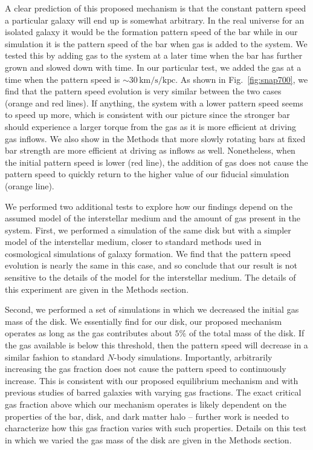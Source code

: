 \documentclass[twoside]{natureprintstyle}
\newcommand{\Nbody}{$N$-body}
\begin{document}
A clear prediction of this proposed mechanism is that the constant pattern
speed a particular galaxy will end up is somewhat arbitrary. In the real
universe for an isolated galaxy it would be the formation pattern speed of the
bar while in our simulation it is the pattern speed of the bar when gas is
added to the system. We tested this by adding gas to the system at a later
time when the bar has further grown and slowed down with time. In our
particular test, we added the gas at a time when the pattern speed is
$\sim30\,\textrm{km}/\textrm{s}/\textrm{kpc}$. As shown in
Fig.~\ref{fig:snap700}, we find that the pattern speed evolution is very
similar between the two cases (orange and red lines). If anything, the system
with a lower pattern speed seems to speed up more, which is consistent with
our picture since the stronger bar should experience a larger torque from the
gas as it is more efficient at driving gas inflows. We also show in the
Methods that more slowly rotating bars at fixed bar strength are more
efficient at driving as inflows as well. Nonetheless, when the initial pattern
speed is lower (red line), the addition of gas does not cause the pattern
speed to quickly return to the higher value of our fiducial simulation (orange
line).

We performed two additional tests to explore how our findings depend on the
assumed model of the interstellar medium and the amount of gas present in the
system. First, we performed a simulation of the same disk but with a simpler
model of the interstellar medium\cite{2003MNRAS.339..289S}, closer to standard
methods used in cosmological simulations of galaxy formation. We find that the
pattern speed evolution is nearly the same in this case, and so conclude that
our result is not sensitive to the details of the model for the interstellar
medium. The details of this experiment are given in the Methods section.

Second, we performed a set of simulations in which we decreased the initial
gas mass of the disk. We essentially find for our disk, our proposed mechanism
operates as long as the gas contributes about $5\%$ of the total mass of the
disk. If the gas available is below this threshold, then the pattern speed
will decrease in a similar fashion to standard \Nbody{} simulations.
Importantly, arbitrarily increasing the gas fraction does not cause the
pattern speed to continuously increase. This is consistent with our proposed
equilibrium mechanism and with previous studies of barred galaxies with varying gas fractions.\cite{2010ApJ...719.1470V} The exact critical gas
fraction above which our mechanism operates is likely dependent on the
properties of the bar, disk, and dark matter halo -- further work is needed to
characterize how this gas fraction varies with such properties. Details on
this test in which we varied the gas mass of the disk are given in the Methods
section.
\end{document}
